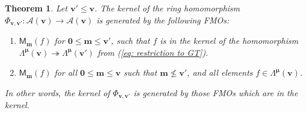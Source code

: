 \documentclass[11pt,reqno]{amsart}
\renewcommand{\mathbf}{\mathbold}
\numberwithin{equation}{section}
\newtheorem{Theorem}[equation]{Theorem}
\theoremstyle{definition}
\newcommand{\cA}{\mathcal{A}}
\newcommand{\bm}{\mathbf{m}}
\newcommand{\bv}{\mathbf{v}}
\renewcommand{\bv}{\mathbf{v}} %
\newcommand{\M}{\mathsf{M}}
\newcommand{\GT}{\Lambda}
\newcommand{\bmu}{{\boldsymbol{\mu}}}
\newcommand{\qzast}{\cA}
\begin{document}
\begin{Theorem}
Let $\bv' \leq \bv$. The  kernel of the ring homomorphism $\Phi_{\bv,\bv'}: \qzast(\bv) \rightarrow \qzast(\bv)$ is generated by the following FMOs:
\begin{enumerate}[label=(\roman*),topsep=3pt,itemsep = 5pt]
    \item $\M_\bm(f)$ for $ \mathbf{0} \leq \bm \leq \bv'$, such that $f$ is in the kernel of the homomorphism $\GT^{\bmu}(\bv) \twoheadrightarrow \GT^{\bmu}(\bv')$ from (\ref{eq: restriction to GT}).
    \item $\M_\bm(f)$ for all $\mathbf{0} \leq \bm \leq \bv$ such that $\bm \not\leq \bv'$, and all elements $f\in \GT^{\bmu}(\bv)$.
\end{enumerate}
In other words, the kernel of $\Phi_{\bv,\bv'}$ is generated by those FMOs which are in the kernel. 
\end{Theorem}
\end{document}
